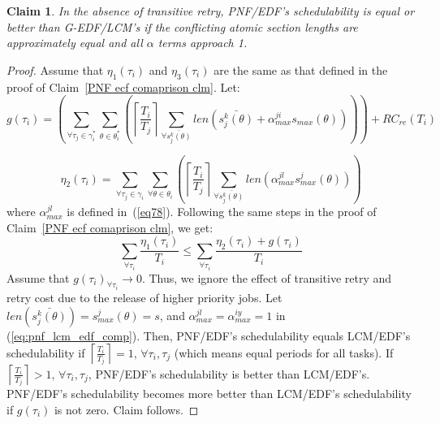 \documentclass[12pt,english]{report}
\newtheorem{clm}{Claim}
\newtheorem{proof}{Proof}
\begin{document}
\begin{clm}\label{sub:pnf_lcm_edf_comp}
In the absence of transitive retry, PNF/EDF's schedulability is equal or better than G-EDF/LCM's if the conflicting atomic section lengths are approximately equal and all $\alpha$ terms approach 1.

\end{clm}
\begin{proof}\normalfont
Assume that $\eta_{1}(\tau_i)$ and $\eta_{3}(\tau_i)$ are the same as that defined in the proof
of Claim~\ref{PNF ecf comaprison clm}. Let:
\begin{equation*}
g(\tau_{i}) = \left(\sum_{\forall\tau_{j}\in\gamma_{i}^{*}}\sum_{\theta\in\theta_{i}^{*}}\left(\left\lceil \frac{T_{i}}{T_{j}}\right\rceil \sum_{\forall\bar{s_{j}^{k}(\theta)}}len\left(\bar{s_{j}^{k}(\theta)} + \alpha_{max}^{ji}s_{max}(\theta)\right)\right)\right)+RC_{re}(T_{i})
\end{equation*}

\[
\eta_{2}(\tau_{i})=\sum_{\forall\tau_{j}\in\gamma_{i}}\sum_{\forall\theta\in\theta_{i}}\left(\left\lceil \frac{T_{i}}{T_{j}}\right\rceil \sum_{\forall\bar{s_{j}^{k}(\theta)}}len\left(\alpha_{max}^{jl}s_{max}^{j}(\theta)\right)\right)
\]
where $\alpha_{max}^{jl}$ is defined in~(\ref{eq78}). Following the same steps in the proof of Claim~\ref{PNF ecf comaprison clm}, we get:
\begin{equation}
\sum_{\forall\tau_{i}}\frac{\eta_{1}(\tau_{i})}{T_{i}}\le\sum_{\forall\tau_{i}}\frac{\eta_{2}(\tau_{i})+g(\tau_{i})}{T_{i}}\label{eq:pnf_lcm_edf_comp}
\end{equation}
Assume that $g(\tau_{i})_{\forall\tau_{i}}\rightarrow0$. Thus, we ignore the effect of transitive retry and retry cost due to the release of higher priority jobs. Let $len(\bar{s_{j}^{k}(\theta)})=s_{max}^{j}(\theta)=s$,
and $\alpha_{max}^{jl}=\alpha_{max}^{iy}=1$ in (\ref{eq:pnf_lcm_edf_comp}). Then, PNF/EDF's schedulability equals LCM/EDF's schedulability if
$\left\lceil \frac{T_{i}}{T_{j}}\right\rceil =1,\,\forall\tau_{i},\tau_{j}$
(which means equal periods for all tasks). If $\left\lceil \frac{T_{i}}{T_{j}}\right\rceil >1,\,\forall\tau_{i},\tau_{j}$,
PNF/EDF's schedulability is better than LCM/EDF's. PNF/EDF's schedulability  becomes more better than LCM/EDF's schedulability if $g(\tau_{i})$
is not zero. Claim follows.
\end{proof}
\end{document}
